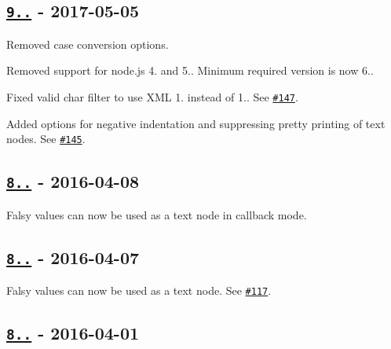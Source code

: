 \subsection*{\href{https://github.com/oozcitak/xmlbuilder-js/compare/v8.2.2...v9.0.0}{\tt 9..} -\/ 2017-\/05-\/05}


\begin{DoxyItemize}
\item Removed case conversion options.
\item Removed support for node.\+js 4. and 5.. Minimum required version is now 6..
\item Fixed valid char filter to use X\+ML 1. instead of 1.. See \href{https://github.com/oozcitak/xmlbuilder-js/issues/147}{\tt \#147}.
\item Added options for negative indentation and suppressing pretty printing of text nodes. See \href{https://github.com/oozcitak/xmlbuilder-js/issues/145}{\tt \#145}.
\end{DoxyItemize}

\subsection*{\href{https://github.com/oozcitak/xmlbuilder-js/compare/v8.2.1...v8.2.2}{\tt 8..} -\/ 2016-\/04-\/08}


\begin{DoxyItemize}
\item Falsy values can now be used as a text node in callback mode.
\end{DoxyItemize}

\subsection*{\href{https://github.com/oozcitak/xmlbuilder-js/compare/v8.2.0...v8.2.1}{\tt 8..} -\/ 2016-\/04-\/07}


\begin{DoxyItemize}
\item Falsy values can now be used as a text node. See \href{https://github.com/oozcitak/xmlbuilder-js/issues/117}{\tt \#117}.
\end{DoxyItemize}

\subsection*{\href{https://github.com/oozcitak/xmlbuilder-js/compare/v8.1.0...v8.2.0}{\tt 8..} -\/ 2016-\/04-\/01}


